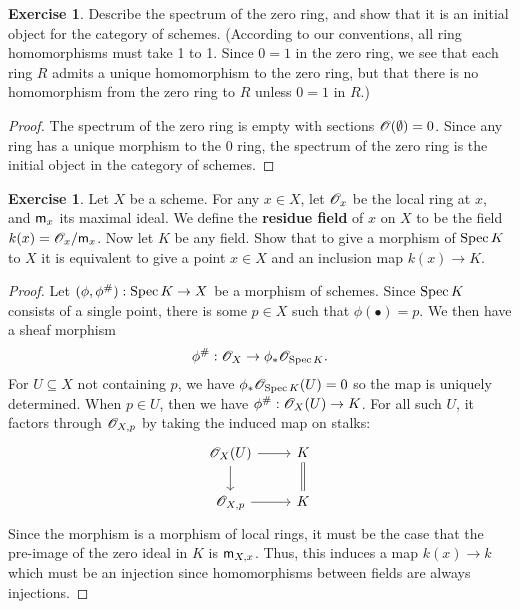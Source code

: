 \documentclass[]{pcmi}
\theoremstyle{plain}
\theoremstyle{definition}
\newtheorem{Exercise}[subsubsection]{Exercise}
\theoremstyle{remark}
\begin{document}
\begin{Exercise}
    Describe the spectrum of the zero ring, and show that it is an initial object for the category of schemes. (According to our conventions, all ring homomorphisms must take 1 to 1. Since $0 = 1$ in the zero ring, we see that each ring $R$ admits a unique homomorphism to the zero ring, but that there is no homomorphism from the zero ring to $R$ unless $0 = 1$ in $R$.)
\end{Exercise}

\begin{proof}
    The spectrum of the zero ring is empty with sections $\mathscr{O}(\emptyset) = 0$. Since any ring has a unique morphism to the $0$ ring, the spectrum of the zero ring is the initial object in the category of schemes. 
\end{proof}

\begin{Exercise}
    Let $X$ be a scheme. For any $x \in X$, let $\mathscr{O}_x$ be the local ring at $x$, and $\mathsf{m}_x$ its maximal ideal. We define the \textbf{residue field} of $x$ on $X$ to be the field $k(x) = \mathscr{O}_x / \mathsf{m}_x$. Now let $K$ be any field. Show that to give a morphism of $\operatorname{Spec} K$ to $X$ it is equivalent to give a point $x \in X$ and an inclusion map $k(x) \to K$. 
\end{Exercise}

\begin{proof}
    Let $(\phi, \phi^{\#}): \operatorname{Spec} K \to X$ be a morphism of schemes. Since $\operatorname{Spec} K$ consists of a single point, there is some $p \in X$ such that $\phi(\bullet) = p$. We then have a sheaf morphism 
    \[
        \phi^{\#} : \mathscr{O}_X \to \phi_* \mathscr{O}_{\operatorname{Spec} K}. 
    \]
    For $U \subseteq X$ not containing $p$, we have $\phi_* \mathscr{O}_{\operatorname{Spec} K}(U) = 0$ so the map is uniquely determined. When $p \in U$, then we have $\phi^{\#} : \mathscr{O}_X(U) \to K$. For all such $U$, it factors through $\mathscr{O}_{X, p}$ by taking the induced map on stalks:
    \[
        \begin{tikzcd}
            {\mathscr{O}_X(U)} & K \\
            {\mathscr{O}_{X, p}} & K
            \arrow[from=1-1, to=1-2]
            \arrow[from=1-1, to=2-1]
            \arrow[Rightarrow, no head, from=1-2, to=2-2]
            \arrow[from=2-1, to=2-2]
        \end{tikzcd}
    \]
    Since the morphism is a morphism of local rings, it must be the case that the pre-image of the zero ideal in $K$ is $\mathsf{m}_{X, x}$. Thus, this induces a map $k(x) \to k$ which must be an injection since homomorphisms between fields are always injections.
\end{proof}
\end{document}
